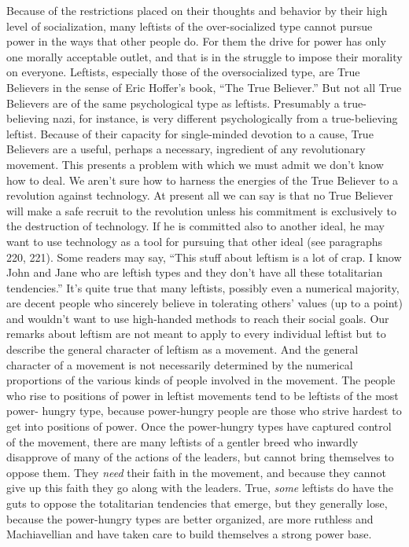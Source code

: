  Because of the restrictions placed on their thoughts and behavior by their high level of socialization, many leftists of the over-socialized type cannot pursue power in the ways that other people do. For them the drive for power has only one morally acceptable outlet, and that is in the struggle to impose their morality on everyone.\break
{} Leftists, especially those of the oversocialized type, are True Believers in the sense of Eric Hoffer’s book, “The True Believer.” But not all True Believers are of the same psychological type as leftists. Presumably a true-believing nazi, for instance, is very different psychologically from a true-believing leftist. Because of their capacity for single-minded devotion to a cause, True Believers are a useful, perhaps a necessary, ingredient of any revolutionary movement. This presents a problem with which we must admit we don’t know how to deal. We aren’t sure how to harness the energies of the True Believer to a revolution against technology. At present all we can say is that no True Believer will make a safe recruit to the revolution unless his commitment is exclusively to the destruction of technology. If he is committed also to another ideal, he may want to use technology as a tool for pursuing that other ideal (see paragraphs 220, 221).
 Some readers may say, “This stuff about leftism is a lot of crap. I know John and Jane who are leftish types and they don’t have all these totalitarian tendencies.” It’s quite true that many leftists, possibly even a numerical majority, are decent people who sincerely believe in tolerating others’ values (up to a point) and wouldn’t want to use high-handed methods to reach their social goals. Our remarks about leftism are not meant to apply to every individual leftist but to describe the general character of leftism as a movement. And the general character of a movement is not necessarily determined by the numerical proportions of the various kinds of people involved in the movement.
 The people who rise to positions of power in leftist movements tend to be leftists of the most power- hungry type, because power-hungry people are those who strive hardest to get into positions of power. Once the power-hungry types have captured control of the movement, there are many leftists of a gentler breed who inwardly disapprove of many of the actions of the leaders, but cannot bring themselves to oppose them. They {\em need} their faith in the movement, and because they cannot give up this faith they go along with the leaders. True, {\em some} leftists do have the guts to oppose the totalitarian tendencies that emerge, but they generally lose, because the power-hungry types are better organized, are more ruthless and Machiavellian and have taken care to build themselves a strong power base.
